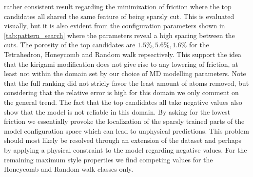 rather consistent result regarding the minimization of friction where the top
candidates all shared the same feature of being sparsly cut. This is evaluated
visually, but it is also evident from the configuration parameters shown in
\cref{tab:pattern_search} where the parameters reveal a high spacing between the
cuts. The porosity of the top candidates are $1.5\%, 5.6\%, 1.6\%$ for the
Tetrahedron, Honeycomb and Random walk repsectively. This support the idea that
the kirigami modification does not give rise to any lowering of friction, at
least not within the domain set by our choice of \acrshort{MD} modelling
parameters. Note that the full ranking did not stricly favor the least amount of
atoms removed, but considering that the relative error is high for this domain
we only comment on the general trend. The fact that the top candidates all take
negative values also show that the model is not reliable in this domain.
By asking for the lowest friction we essentially provoke the localization of the sparsly trained parts of the model configuration space which can lead to unphysical predictions. This problem should most likely be resolved through an extension of the dataset and perhaps by applying a physical constraint to the model regarding negative values. For the remaining maximum style properties we find competing values for the Honeycomb and Random walk classes only. 


